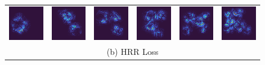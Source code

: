 \documentclass[letterpaper]{article} %
\begin{document}
\begin{figure}[!t]
\begin{tabular}{cccccc}
\multicolumn{1}{c}{\includegraphics[width=0.125\columnwidth]{saliency/hrr/edges/edges_1.png}} \hspace{-12pt} &  \multicolumn{1}{c}{\includegraphics[width=0.125\columnwidth]{saliency/hrr/edges/edges_2.png}} \hspace{-12pt} & \multicolumn{1}{c}{\includegraphics[width=0.125\columnwidth]{saliency/hrr/edges/edges_3.png}} \hspace{-12pt} & \multicolumn{1}{c}{\includegraphics[width=0.125\columnwidth]{saliency/hrr/edges/edges_4.png}} \hspace{-12pt} & \multicolumn{1}{c}{\includegraphics[width=0.125\columnwidth]{saliency/hrr/edges/edges_5.png}} \hspace{-12pt} & \multicolumn{1}{c}{\includegraphics[width=0.125\columnwidth]{saliency/hrr/edges/edges_6.png}} \\
\multicolumn{6}{c}{(b) HRR Loss} \\


\end{tabular}
\end{figure}
\end{document}
